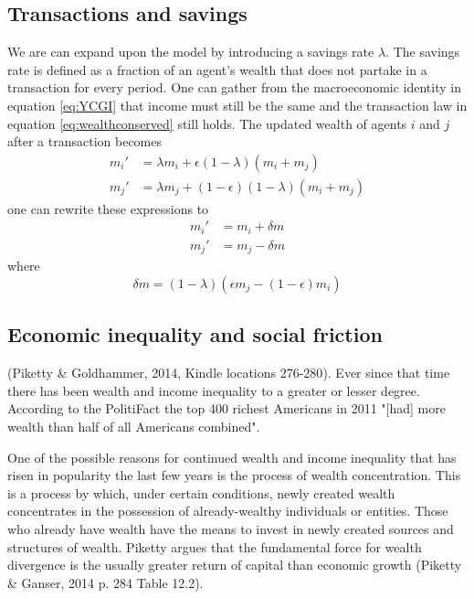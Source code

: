 \documentclass[10pt, a4paper]{amsart}
\begin{document}
\subsection{Transactions and savings}
We are can expand upon the model by introducing a savings rate $\lambda$. The savings rate is defined as a fraction of an agent's wealth that does not partake in a transaction for every period. One can gather from the macroeconomic identity in equation \ref{eq:YCGI} that income must still be the same and the transaction law in equation \ref{eq:wealthconserved} still holds. The updated wealth of agents $i$ and $j$ after a transaction becomes
\begin{align}
m_i' &= \lambda m_i + \epsilon (1 - \lambda) (m_i + m_j) \\
m_j' &= \lambda m_j + (1- \epsilon) (1 - \lambda) (m_i + m_j)
\end{align}
one can rewrite these expressions to
\begin{align*}
m_i' &= m_i + \delta m \\
m_j' &= m_j - \delta m
\end{align*}
where
\begin{equation}
\delta m = (1 - \lambda)(\epsilon m_j - (1 - \epsilon)m_i)
\end{equation}

\subsection{Economic inequality and social friction}
 (Piketty \& Goldhammer, 2014, Kindle locations 276-280\cite{Piketty}). Ever since that time there has been wealth and income inequality to a greater or lesser degree. According to the PolitiFact the top 400 richest Americans in 2011 "[had] more wealth than half of all Americans combined"\cite{Moore}.

One of the possible reasons for continued wealth and income inequality that has risen in popularity the last few years is the process of wealth concentration. This is a process by which, under certain conditions, newly created wealth concentrates in the possession of already-wealthy individuals or entities. Those who already have wealth have the means to invest in newly created sources and structures of wealth. Piketty argues that the fundamental force for wealth divergence is the usually greater return of capital than economic growth (Piketty \& Ganser, 2014 p. 284 Table 12.2\cite{Piketty}).
\end{document}
